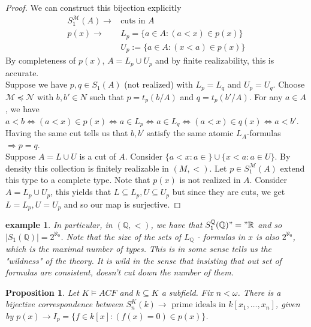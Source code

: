 \documentclass[letterpaper, 12pt]{article}
\newcommand{\fin}{\qquad \quad \hfill \framebox[1.75mm][l]{\,}}
\newcommand{\cM}{\mathcal{M}}
\newcommand{\cN}{\mathcal{N}}
\newcommand{\bR}{\mathbb{R}}
\newcommand{\bQ}{\mathbb{Q}}
\theoremstyle{stdthm}
\newtheorem{prop}[thm]{Proposition}
\theoremstyle{stddef}
\newtheorem{eg}[thm]{example} %
\theoremstyle{stdnonum}
\theoremstyle{stdqands}
\theoremstyle{stdbold}
\begin{document}
\begin{proof}
We can construct this bijection explicitly
\begin{align*}
S_1^\cM(A)  \to &\mbox{cuts in } A\\
p(x)  \to &L_p = \{a \in A: (a<x) \in p(x) \}\\
& U_p := \{a \in A: (x<a) \in p(x) \}
\end{align*}
By completeness of $p(x)$, $A = L_p \cup U_p$ and by finite realizability, this is accurate.  \\

 Suppose we have $p,q \in S_1(A)$ (not realized) with $L_p = L_q$ and $U_p = U_q$. Choose $\cM \preceq \cN$ with $b,b' \in N$ such that $p = t_p(b/A)$ and $q = t_p(b'/A)$.  For any $a \in A$, we have $a<b \Leftrightarrow (a<x) \in p(x) \Leftrightarrow a \in L_p \Leftrightarrow a \in L_q \Leftrightarrow (a<x) \in q(x) \Leftrightarrow a<b'$. Having the same cut tells us that $b,b'$ satisfy the same atomic $L_A$-formulas $\Rightarrow p=q$. \\

 Suppose $A = L\cup U$ is a cut of $A$. Consider $\{a < x: a \in \} \cup \{x <a: a \in U\}$. By density this collection is finitely realizable in $(M,<)$. Let $p \in S_1^\cM(A)$ extend this type to a complete type. Note that $p(x)$ is not realized in $A$. Consider $A = L_p \cup U_p$, this yields that $L \subseteq L_p, U \subseteq U_p$ but since they are cuts, we get $L=L_p, U = U_p$ and so our map is surjective. 
\end{proof}

\begin{eg}
In particular, in $(\bQ, <)$, we have that $S_1^\bQ (\bQ) "=" \bR$ and so $|S_1(\bQ)| = 2^{\aleph_0}$. Note that the size of the sets of $L_\bQ$ - formulas in $x$ is also $2^{\aleph_0}$, which is the maximal number of types. This is in some sense tells us the "wildness" of the theory. It is wild in the sense that insisting that out set of formulas are consistent, doesn't cut down the number of them. 
\end{eg}

\begin{prop}
Let $K \models ACF$ and $k \subseteq K$ a subfield. Fix $n < \omega$.  There is a bijective correspondence between $S_n^K(k) \to \mbox{ prime ideals in } k[x_1,\dots, x_n]$, given by $p(x) \to I_p = \{ f \in k[x]: (f(x) = 0) \in p(x)\}$. 
\end{prop}
\end{document}
